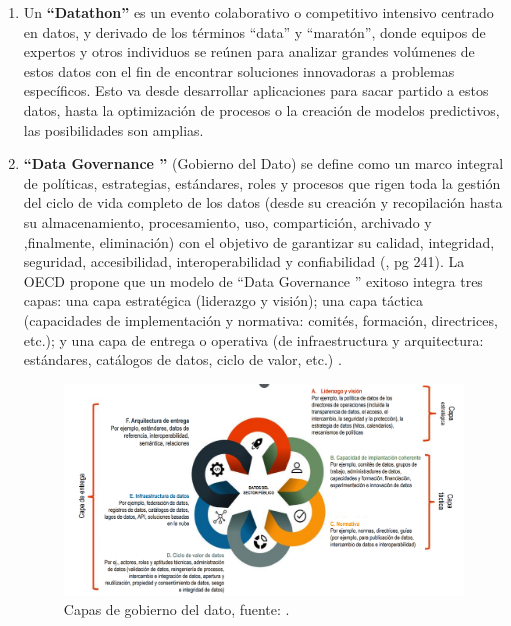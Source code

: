 \begin{enumerate}
	\item Un \textbf{``Datathon''} \label{def7} \citep{Datathon2016Anslow} es un evento colaborativo o competitivo intensivo centrado en datos, y derivado de los términos ``data'' y ``maratón'', donde equipos de expertos y otros individuos se reúnen para analizar grandes volúmenes de estos datos con el fin de encontrar soluciones innovadoras a problemas específicos. Esto va desde desarrollar aplicaciones para sacar partido a estos datos, hasta la optimización de procesos o la creación de modelos predictivos, las posibilidades son amplias. \\
	
	\item \textbf{``Data Governance ''} \label{def10} (Gobierno del Dato) se define como un marco integral de políticas, estrategias, estándares, roles y procesos que rigen toda la gestión del ciclo de vida completo de los datos (desde su creación y recopilación hasta su almacenamiento, procesamiento, uso, compartición, archivado y ,finalmente, eliminación) con el objetivo de garantizar su calidad, integridad, seguridad, accesibilidad, interoperabilidad y confiabilidad (\cite{HerreraCapriz2024}, pg 241). La OECD propone que un modelo de ``Data Governance '' exitoso integra tres capas: una capa estratégica (liderazgo y visión); una capa táctica (capacidades de implementación y normativa: comités, formación, directrices, etc.); y una capa de entrega o operativa (de infraestructura y arquitectura: estándares, catálogos de datos, ciclo de valor, etc.) \citep{OECD2019}.
			
	\begin{figure}[h]
		\begin{center}
			\includegraphics[scale=0.3]{Imagenes/Bitmap/data_gobernance.png} 
			\caption{Capas de gobierno del dato, fuente: \citep{OECD2019}.}
		\end{center}
	\end{figure}
	

\end{enumerate}
